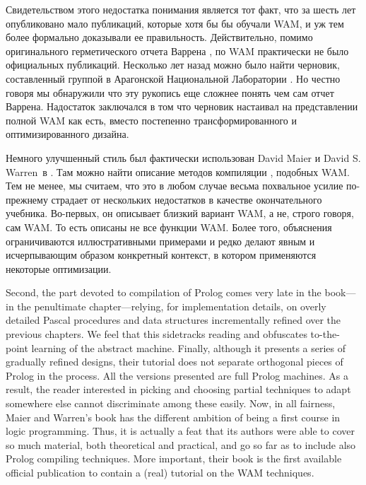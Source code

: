 \secdown

Свидетельством этого недостатка понимания является тот факт, что за шесть лет
опубликовано мало публикаций, которые хотя бы бы обучали WAM, и уж тем более
формально доказывали ее правильность. Действительно, помимо оригинального
герметического отчета Варрена \cite{War83}, по WAM практически не было
официальных публикаций. Несколько лет назад можно было найти черновик,
составленный группой в Арагонской Национальной Лаборатории \cite{GLLO85}. Но
честно говоря мы обнаружили что эту рукопись еще сложнее понять чем сам отчет
Варрена. Надостаток заключался в том что черновик настаивал на представлении
полной WAM как есть, вместо постепенно трансформированного и оптимизированного
дизайна.

\clearpage
Немного улучшенный стиль был фактически использован David Maier и David S.
Warren\ в \cite{MW88}. Там можно найти описание методов компиляции \prolog,
подобных WAM.
Тем не менее, мы считаем, что это в любом случае весьма похвальное усилие
по-прежнему страдает от нескольких недостатков в качестве окончательного
учебника. Во-первых, он описывает близкий вариант WAM, а не, строго говоря, сам
WAM. То есть описаны не все функции WAM.
Более того, объяснения ограничиваются иллюстративными примерами и редко делают
явным и исчерпывающим образом конкретный контекст, в котором применяются
некоторые оптимизации.

Second, the part
devoted to compilation of Prolog comes very late in the book—in the penultimate
chapter—relying, for implementation details, on overly detailed Pascal procedures
and data structures incrementally refined over the previous chapters. We
feel that this sidetracks reading and obfuscates to-the-point learning of the abstract
machine. Finally, although it presents a series of gradually refined designs,
their tutorial does not separate orthogonal pieces of Prolog in the process. All the
versions presented are full Prolog machines. As a result, the reader interested in
picking and choosing partial techniques to adapt somewhere else cannot discriminate
among these easily. Now, in all fairness, Maier and Warren’s book has the
different ambition of being a first course in logic programming. Thus, it is actually
a feat that its authors were able to cover so much material, both theoretical
and practical, and go so far as to include also Prolog compiling techniques. More
important, their book is the first available official publication to contain a (real)
tutorial on the WAM techniques.

